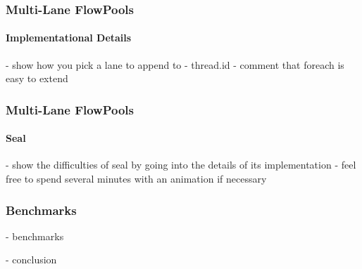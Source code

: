 \documentclass{beamer}
\begin{document}
\begin{frame}
  \frametitle{Multi-Lane FlowPools}
  \framesubtitle{Implementational Details}

- show how you pick a lane to append to - thread.id
- comment that foreach is easy to extend

\end{frame}

\begin{frame}
  \frametitle{Multi-Lane FlowPools}
  \framesubtitle{Seal}

- show the difficulties of seal by going into the details of its implementation - feel free to spend several minutes with an animation if necessary

\end{frame}

\begin{frame}
  \frametitle{Benchmarks}

- benchmarks
\end{frame}

\begin{frame}
- conclusion
\end{frame}
\end{document}
